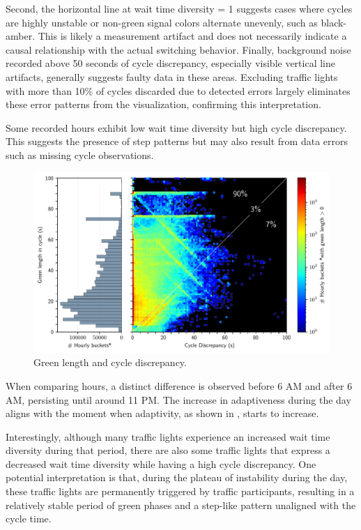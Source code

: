 Second, the horizontal line at wait time diversity = 1 suggests cases where cycles are highly unstable or non-green signal colors alternate unevenly, such as black-amber. This is likely a measurement artifact and does not necessarily indicate a causal relationship with the actual switching behavior. Finally, background noise recorded above 50 seconds of cycle discrepancy, especially visible vertical line artifacts, generally suggests faulty data in these areas. Excluding traffic lights with more than 10\% of cycles discarded due to detected errors largely eliminates these error patterns from the visualization, confirming this interpretation.

Some recorded hours exhibit low wait time diversity but high cycle discrepancy. This suggests the presence of step patterns but may also result from data errors such as missing cycle observations.



\begin{figure}[t]
    \centering
    \includegraphics[width=\linewidth]{images/cycle_discrepancy_green_length_heatmap.pdf}
    \caption{Green length and cycle discrepancy.}\label{fig:green-length-cycle-discrepancy}
\end{figure}



When comparing hours, a distinct difference is observed before 6 AM and after 6 AM, persisting until around 11 PM. The increase in adaptiveness during the day aligns with the moment when adaptivity, as shown in , starts to increase. 

Interestingly, although many traffic lights experience an increased wait time diversity during that period, there are also some traffic lights that express a decreased wait time diversity while having a high cycle discrepancy. One potential interpretation is that, during the plateau of instability during the day, these traffic lights are permanently triggered by traffic participants, resulting in a relatively stable period of green phases and a step-like pattern unaligned with the cycle time.

